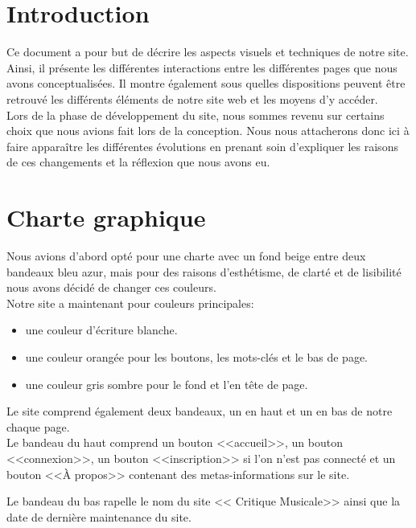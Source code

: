 
\section{Introduction}

	\begin{paragraphe}
		Ce document a pour but de décrire les aspects visuels et techniques de notre site.\\
		Ainsi, il présente les différentes interactions entre les différentes pages que nous avons conceptualisées.
		Il montre également sous quelles dispositions peuvent être retrouvé les différents éléments de notre site web et les moyens d'y accéder.\\
		Lors de la phase de développement du site, nous sommes revenu sur certains choix que nous avions fait lors de la conception.
		Nous nous attacherons donc ici à faire apparaître les différentes évolutions en prenant soin d'expliquer les raisons de
		ces changements et la réflexion que nous avons eu.
	\end{paragraphe}

\section{Charte graphique}

	\begin{paragraphe}
	    Nous avions d'abord opté pour une charte avec un fond beige entre deux bandeaux bleu azur, mais pour des raisons
	    d'esthétisme, de clarté et de lisibilité nous avons décidé de changer ces couleurs.\\

		Notre site a maintenant pour couleurs principales:
            \begin{itemize}
            \item une couleur d'écriture blanche.
            \item une couleur orangée pour les boutons, les mots-clés et le bas de page.
            \item une couleur gris sombre pour le fond et l'en tête de page.
            \end{itemize}
    \end{paragraphe}

    \begin{paragraphe}
		Le site comprend également deux bandeaux, un en haut et un en bas de notre chaque page.\\
		Le bandeau du haut comprend un bouton <<accueil>>,
		un bouton <<connexion>>, un bouton <<inscription>> si l'on n'est pas connecté et un bouton <<À propos>> contenant des metas-informations sur le site.

        Le bandeau du bas rapelle le nom du site << Critique Musicale>> ainsi que la date de dernière maintenance du site.
    \end{paragraphe}

